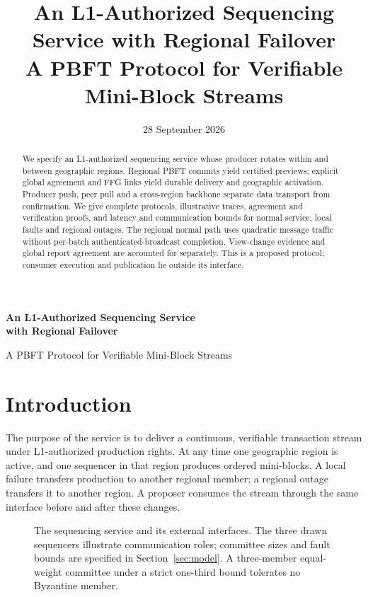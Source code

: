\documentclass[11pt,a4paper,onecolumn]{article}
\title{An L1-Authorized Sequencing Service with Regional Failover\\
\large A PBFT Protocol for Verifiable Mini-Block Streams}
\author{}\date{28 September 2026}
\theoremstyle{remark}\newtheorem{example}[definition]{Example}
\newcounter{protocol}
\begin{document}
\begin{center}
{\Large\bfseries An L1-Authorized Sequencing Service\\with Regional Failover\par}
\vspace{.5em}
{\normalsize A PBFT Protocol for Verifiable Mini-Block Streams\par}
\vspace{.4em}{\small 28 September 2026}
\end{center}
\begin{abstract}
We specify an L1-authorized sequencing service whose producer rotates within
and between geographic regions. Regional PBFT commits yield certified previews;
explicit global agreement and FFG links yield durable delivery and geographic
activation. Producer push, peer pull and a cross-region backbone separate data
transport from confirmation. We give complete protocols, illustrative traces,
agreement and verification proofs, and latency and communication bounds for
normal service, local faults and regional outages. The regional normal path uses
quadratic message traffic without per-batch authenticated-broadcast completion.
View-change evidence and global report agreement are accounted for separately.
This is a proposed protocol;
consumer execution and publication lie outside its interface.
\end{abstract}

\section{Introduction}\label{sec:intro}
The purpose of the service is to deliver a continuous, verifiable transaction
stream under L1-authorized production rights. At any time one geographic region
is active, and one sequencer in that region produces ordered mini-blocks.
A local failure transfers production to another regional member; a regional
outage transfers it to another region. A proposer consumes the stream through
the same interface before and after these changes. 

\begin{figure}[H]\centering

\caption{The sequencing service and its external interfaces. The three drawn
sequencers illustrate communication roles; committee sizes and fault bounds
are specified in Section~\ref{sec:model}. A three-member equal-weight committee
under a strict one-third bound tolerates no Byzantine member.}
\label{fig:architecture}
\end{figure}
\end{document}

